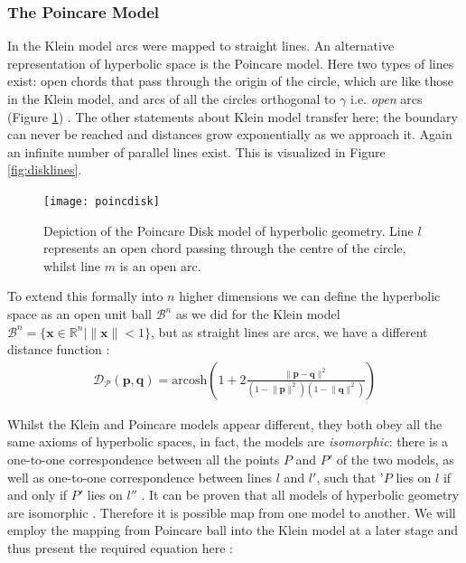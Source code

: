 \documentclass[12pt]{report}
\begin{document}
\subsubsection{The Poincare Model}
In the Klein model arcs were mapped to straight lines. An alternative representation of hyperbolic space is the Poincare model. Here two types of lines exist: open chords that pass through the origin of the circle, which are like those in the Klein model, and arcs of all the circles orthogonal to $\gamma$ i.e. \textit{open} arcs (Figure \ref{fig:pdisk}) \cite{Greenberg1994}. The other statements about Klein model transfer here; the boundary can never be reached and distances grow exponentially as we approach it. Again an infinite number of parallel lines exist. This is visualized in Figure \ref{fig:disklines}.

\begin{figure}
  \centering
	\texttt{[image: poincdisk]}
	\caption{Depiction of the Poincare Disk model of hyperbolic geometry. Line $l$ represents an open chord passing through the centre of the circle, whilst line $m$ is an open arc.}
	\label{fig:pdisk}
\end{figure}

To extend this formally into $n$ higher dimensions we can define the hyperbolic space as an open unit ball $\mathcal{B}^n$ as we did for the Klein model $\mathcal{B}^n = \{\mathbf{x} \in \mathbb{R}^n | \lVert \mathbf{x} \rVert <1 \}$, but as straight lines are arcs, we have a different distance function \cite{Iversen1992}:
\begin{align}
  \mathcal{D_P}(\mathbf{p}, \mathbf{q}) = \text{arcosh} \left(1 + 2 \frac{\lVert \mathbf{p} - \mathbf{q} \rVert^2}{(1-\lVert \mathbf{p}\rVert^2)(1-\lVert \mathbf{q}\rVert^2)}   \right) 
  \label{eq:pdist}
\end{align}

Whilst the Klein and Poincare models appear different, they both obey all the same axioms of hyperbolic spaces, in fact, the models are \textit{isomorphic}: there is a one-to-one correspondence between all the points $P$ and $P'$ of the two models, as well as one-to-one correspondence between lines $l$ and $l'$, such that '$P$ lies on $l$ if and only if $P'$ lies on $l''$ \cite{Greenberg1994}. It can be proven that all models of hyperbolic geometry are isomorphic \cite{Greenberg1994}. Therefore it is possible map from one model to another. We will employ the mapping from Poincare ball into the Klein model at a later stage and thus present the required equation here \cite{Greenberg1994}:
\end{document}
